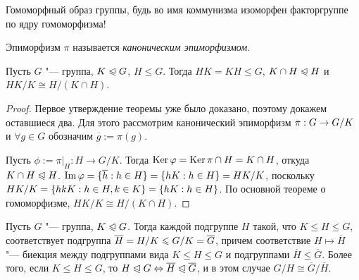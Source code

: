 \begin{note}
	Гомоморфный образ группы, будь во имя коммунизма изоморфен факторгруппе по ядру гомоморфизма!
\end{note}

\begin{note}
	Эпиморфизм $\pi$ называется \textit{каноническим эпиморфизмом}.
\end{note}

\begin{theorem}
	Пусть $G$ "--- группа, $K \trianglelefteqslant G$, $H \le G$. Тогда $HK = KH \le G$, $K \cap H \trianglelefteqslant H$ и $HK / K \cong H / (K \cap H)$.
\end{theorem}

\begin{proof}
	Первое утверждение теоремы уже было доказано, поэтому докажем оставшиеся два. Для этого рассмотрим канонический эпиморфизм $\pi: G \hm\to G / K$ и $\forall g \in G$ обозначим $\overline{g} := \pi(g)$.
	
	Пусть $\phi := \pi|_H : H \to G/ K$. Тогда $\operatorname{Ker}\varphi = \operatorname{Ker}\pi \cap H = K \cap H$, откуда $K \cap H \trianglelefteqslant H$. $\im\phi = \{\overline{h}: h \in H\} = \{hK: h \hm\in H\} = HK / K$, поскольку $HK / K \hm= \{hkK: h \in H, k \hm\in K\} = \{hK: h \in H\}$. По основной теореме о гомоморфизме, $HK / K \cong H / (K \cap H)$.
\end{proof}

\begin{theorem}
	Пусть $G$ "--- группа, $K \trianglelefteqslant G$. Тогда каждой подгруппе $H$ такой, что $K \le H \le G$, соответствует подгруппа $\overline{H} = H / K \hm\le G / K = \overline{G}$, причем соответствие $H \mapsto \overline{H}$ "--- биекция между подгруппами вида $K \le H \le G$ и подгруппами $\overline{H} \le \overline{G}$. Более того, если $K \le H \le G$, то $H \trianglelefteqslant G \Leftrightarrow \overline{H} \trianglelefteqslant \overline{G}$, и в этом случае $G / H \cong \overline{G} / \overline{H}$.
\end{theorem}

